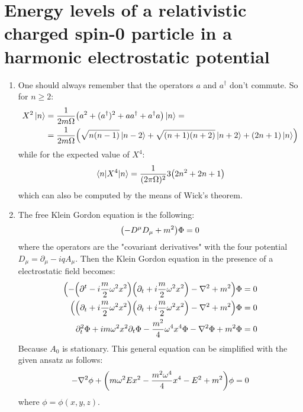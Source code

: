 \documentclass[11pt, oneside]{article}   	%
\begin{document}
\section{Energy levels of a relativistic charged spin-0 particle in a harmonic electrostatic potential}

\begin{enumerate}[label=\alph*)]

\item One should always remember that the operators $a$ and $a^\dagger$ don't commute. So for $n\ge2$:
\begin{align*}
	X^2 \ket{n} &= \frac{1}{2m\Omega} \qty(a^2 + (a^\dagger )^2 + a a^\dagger + a^\dagger a ) \ket{n} =  \\
	&= \frac{1}{2m\Omega} \qty( \sqrt{n(n-1)}\ket{n-2} + \sqrt{(n+1)(n+2)} \ket{n+2} + (2n+1) \ket{n})
\end{align*}
while for the expected value of $X^4$:
\[
	\mel{n}{X^4}{n} =  \frac{1}{(2\pi \Omega)^2} 3 \qty(2n^2 + 2n +1)
\]
which can also be computed by the means of Wick's theorem.

\item The free Klein Gordon equation is the following:
\[
	\qty(- D^\mu D_\mu + m^2) \Phi = 0
\]
where the operators are the "covariant derivatives" with the four potential $D_{\mu} = \partial_\mu - iqA_\mu$. Then the Klein Gordon equation in the presence of a electrostatic field becomes:
\begin{align*}
	\qty(-\qty(\partial^t - i \frac{m}{2}\omega^2 x^2) \qty(\partial_t + i\frac{m}{2} \omega^2 x^2) - \laplacian + m^2) \Phi &= 0 \\
	\qty( \qty(\partial_t + i\frac{m}{2} \omega^2 x^2) \qty(\partial_t + i\frac{m}{2} \omega^2 x^2) - \laplacian + m^2 )\Phi &= 0 \\
	\partial^2_t \Phi + i m\omega^2 x^2 \partial_t \Phi - \frac{m^2}{4} \omega^4x^4 \Phi - \laplacian \Phi + m^2 \Phi&= 0
\end{align*}
Because $A_0$ is stationary. This general equation can be simplified with the given ansatz as follows:
\[
	-\laplacian \phi + \qty(m\omega^2 E x^2 - \frac{m^2\omega^4}{4} x^4 - E^2 + m^2)\phi = 0  
\]
where $\phi = \phi(x,y,z)$.


\end{enumerate}
\end{document}

